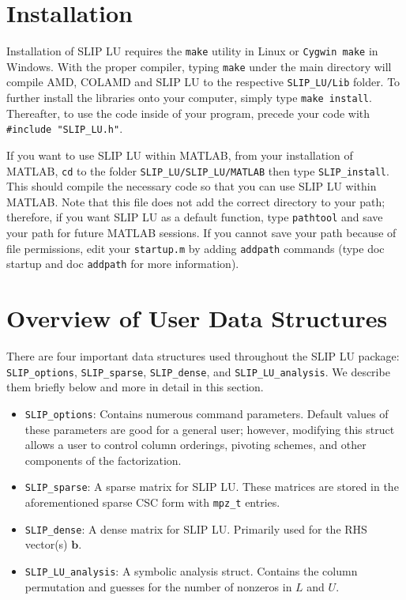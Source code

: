\documentclass[11pt]{article}
\theoremstyle{definition}
\begin{document}
\section{Installation} \label{s:install}

Installation of SLIP LU requires the \verb|make| utility in Linux or
\verb|Cygwin make| in Windows. With the proper compiler, typing \verb|make|
under the main directory will compile AMD, COLAMD and SLIP LU to the respective
\verb'SLIP_LU/Lib' folder. To further install the libraries onto your computer,
simply type \verb|make install|.  Thereafter, to use the code inside of your
program, precede your code with \verb|#include "SLIP_LU.h"|.

If you want to use SLIP LU within MATLAB, from your installation of MATLAB,
\verb|cd| to the folder \verb|SLIP_LU/SLIP_LU/MATLAB| then type
\verb|SLIP_install|. This should compile the necessary code so that you can use
SLIP LU within MATLAB. Note that this file does not add the correct directory
to your path; therefore, if you want SLIP LU as a default function, type
\verb|pathtool| and save your path for future MATLAB sessions. If you cannot
save your path because of file permissions, edit your \verb|startup.m| by
adding \verb|addpath| commands (type doc startup and doc \verb|addpath| for
more information).

\section{Overview of User Data Structures} \label{s:Structures}

There are four important data structures used throughout the SLIP LU package:
\verb|SLIP_options|, \verb|SLIP_sparse|, \verb|SLIP_dense|, and
\verb|SLIP_LU_analysis|. We describe them briefly below and more in detail in
this section.

\begin{itemize}
    \item \verb|SLIP_options|: Contains numerous command parameters. Default
    values of these parameters are good for a general user; however, modifying
    this struct allows a user to control column orderings, pivoting schemes,
    and other components of the factorization.

    \item \verb|SLIP_sparse|: A sparse matrix for SLIP LU. These matrices are
    stored in the aforementioned sparse CSC form with \verb|mpz_t| entries.

    \item \verb|SLIP_dense|: A dense matrix for SLIP LU. Primarily used for the
    RHS vector(s) $\mathbf{b}$.

    \item \verb|SLIP_LU_analysis|: A symbolic analysis struct. Contains the
    column permutation and guesses for the number of nonzeros in $L$ and $U$.
\end{itemize}
\end{document}
